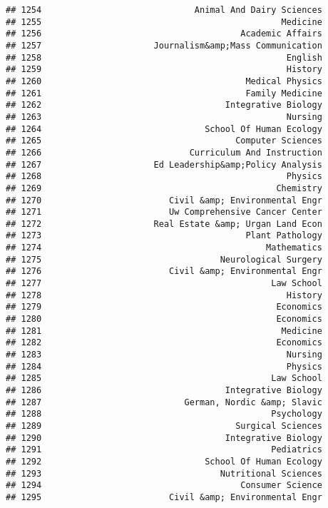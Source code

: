 \documentclass[
]{article}
\begin{document}
\begin{verbatim}
## 1254                              Animal And Dairy Sciences
## 1255                                               Medicine
## 1256                                       Academic Affairs
## 1257                      Journalism&amp;Mass Communication
## 1258                                                English
## 1259                                                History
## 1260                                        Medical Physics
## 1261                                        Family Medicine
## 1262                                    Integrative Biology
## 1263                                                Nursing
## 1264                                School Of Human Ecology
## 1265                                      Computer Sciences
## 1266                             Curriculum And Instruction
## 1267                      Ed Leadership&amp;Policy Analysis
## 1268                                                Physics
## 1269                                              Chemistry
## 1270                         Civil &amp; Environmental Engr
## 1271                         Uw Comprehensive Cancer Center
## 1272                      Real Estate &amp; Urgan Land Econ
## 1273                                        Plant Pathology
## 1274                                            Mathematics
## 1275                                   Neurological Surgery
## 1276                         Civil &amp; Environmental Engr
## 1277                                             Law School
## 1278                                                History
## 1279                                              Economics
## 1280                                              Economics
## 1281                                               Medicine
## 1282                                              Economics
## 1283                                                Nursing
## 1284                                                Physics
## 1285                                             Law School
## 1286                                    Integrative Biology
## 1287                            German, Nordic &amp; Slavic
## 1288                                             Psychology
## 1289                                      Surgical Sciences
## 1290                                    Integrative Biology
## 1291                                             Pediatrics
## 1292                                School Of Human Ecology
## 1293                                   Nutritional Sciences
## 1294                                       Consumer Science
## 1295                         Civil &amp; Environmental Engr

\end{verbatim}
\end{document}
